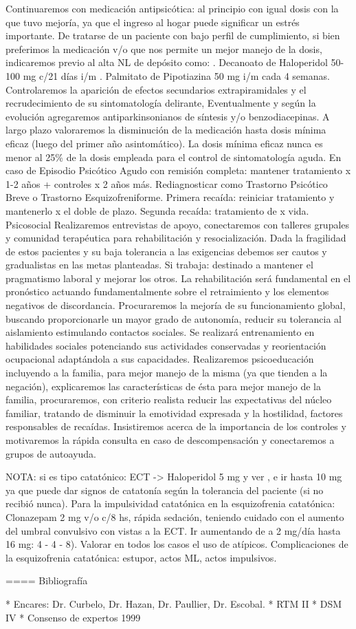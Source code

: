 \documentclass[encares.tex]{subfiles}
\begin{document}
Continuaremos con medicación antipsicótica: al principio con igual dosis con la que tuvo mejoría, ya que el ingreso al hogar puede significar un estrés importante. De tratarse de un paciente con bajo perfil de cumplimiento, si bien preferimos la medicación v/o que nos permite un mejor manejo de la dosis, indicaremos previo al alta NL de depósito como: . Decanoato de Haloperidol 50-100 mg c/21 días i/m . Palmitato de Pipotiazina 50 mg i/m cada 4 semanas. Controlaremos la aparición de efectos secundarios extrapiramidales y el recrudecimiento de su sintomatología delirante, Eventualmente y según la evolución agregaremos antiparkinsonianos de síntesis y/o benzodiacepinas. A largo plazo valoraremos la disminución de la medicación hasta dosis mínima eficaz (luego del primer año asintomático). La dosis mínima eficaz nunca es menor al 25\% de la dosis empleada para el control de sintomatología aguda. En caso de Episodio Psicótico Agudo con remisión completa: mantener tratamiento x 1-2 años + controles x 2 años más. Rediagnosticar como Trastorno Psicótico Breve o Trastorno Esquizofreniforme. Primera recaída: reiniciar tratamiento y mantenerlo x el doble de plazo. Segunda recaída: tratamiento de x vida. Psicosocial Realizaremos entrevistas de apoyo, conectaremos con talleres grupales y comunidad terapéutica para rehabilitación y resocialización. Dada la fragilidad de estos pacientes y su baja tolerancia a las exigencias debemos ser cautos y gradualistas en las metas planteadas. Si trabaja: destinado a mantener el pragmatismo laboral y mejorar los otros. La rehabilitación será fundamental en el pronóstico actuando fundamentalmente sobre el retraimiento y los elementos negativos de discordancia. Procuraremos la mejoría de su funcionamiento global, buscando proporcionarle un mayor grado de autonomía, reducir su tolerancia al aislamiento estimulando contactos sociales. Se realizará entrenamiento en habilidades sociales potenciando sus actividades conservadas y reorientación ocupacional adaptándola a sus capacidades. Realizaremos psicoeducación incluyendo a la familia, para mejor manejo de la misma (ya que tienden a la negación), explicaremos las características de ésta para mejor manejo de la familia, procuraremos, con criterio realista reducir las expectativas del núcleo familiar, tratando de disminuir la emotividad expresada y la hostilidad, factores responsables de recaídas. Insistiremos acerca de la importancia de los controles y motivaremos la rápida consulta en caso de descompensación y conectaremos a grupos de autoayuda.

NOTA: si es tipo catatónico: ECT -> Haloperidol 5 mg y ver , e ir hasta 10 mg ya que puede dar signos de catatonía según la tolerancia del paciente (si no recibió nunca). Para la impulsividad catatónica en la esquizofrenia catatónica: Clonazepam 2 mg v/o c/8 hs, rápida sedación, teniendo cuidado con el aumento del umbral convulsivo con vistas a la ECT. Ir aumentando de a 2 mg/día hasta 16 mg: 4 - 4 - 8). Valorar en todos los casos el uso de atípicos. Complicaciones de la esquizofrenia catatónica: estupor, actos ML, actos impulsivos.

==== Bibliografía

* Encares: Dr. Curbelo, Dr. Hazan, Dr. Paullier, Dr. Escobal.
* RTM II
* DSM IV
* Consenso de expertos 1999
\end{document}

